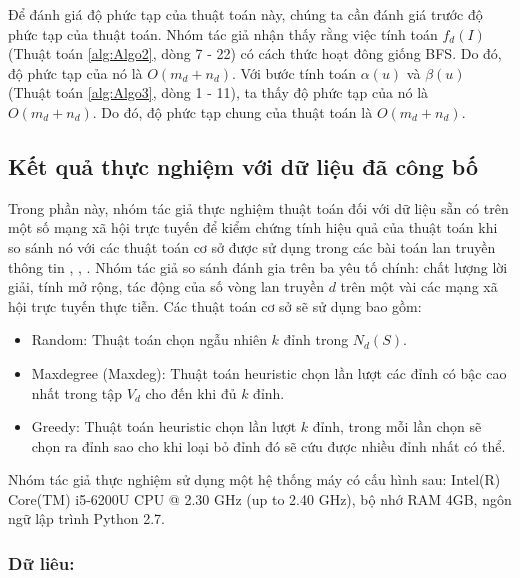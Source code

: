 Để đánh giá độ phức tạp của thuật toán này, chúng ta cần đánh giá trước độ phức tạp của thuật toán. Nhóm tác giả nhận thấy rằng việc tính  toán $f_{d}(I)$ (Thuật toán \ref{alg:Algo2}, dòng 7 - 22) có cách thức hoạt đông giống BFS. Do đó, độ phức tạp của nó là $O(m_{d} + n_{d})$. Với bước tính toán $\alpha(u)$ và $\beta(u)$ (Thuật toán \ref{alg:Algo3}, dòng 1 - 11), ta thấy độ phức tạp của nó là $O(m_{d} + n_{d})$. Do đó, độ phức tạp chung của thuật toán là $O(m_{d} + n_{d})$. 

\subsection{Kết quả thực nghiệm với dữ liệu đã công bố}

Trong phần này, nhóm tác giả thực nghiệm thuật toán đối với dữ liệu sẵn có trên một số mạng xã hội trực tuyến để kiểm chứng tính hiệu quả của thuật toán khi so sánh nó với các thuật toán cơ sở được sử dụng trong các bài toán lan truyền thông tin \cite{nguyen30}, \cite{kemple1}, \cite{zhang32}. Nhóm tác giả so sánh đánh gia trên ba yêu tố chính: chất lượng lời giải, tính mở rộng, tác động của số vòng lan truyền $d$ trên một vài các mạng xã hội trực tuyến thực tiễn. Các thuật toán cơ sở sẽ sử dụng bao gồm:
\begin{itemize}
	\item Random: Thuật toán chọn ngẫu nhiên $k$ đỉnh trong $N_{d}(S)$.
	
	\item Maxdegree (Maxdeg): Thuật toán heuristic chọn lần lượt các đỉnh có bậc cao nhất trong tập $V_{d}$ cho đến khi đủ $k$ đỉnh.
	
	\item Greedy: Thuật toán heuristic chọn lần lượt $k$ đỉnh, trong mỗi lần chọn sẽ chọn ra đỉnh sao cho khi loại bỏ đỉnh đó sẽ cứu được nhiều đỉnh nhất có thể.
\end{itemize}

Nhóm tác giả thực nghiệm sử dụng một hệ thống máy có cấu hình sau: Intel(R) Core(TM) i5-6200U CPU @ 2.30 GHz (up to 2.40 GHz), bộ nhớ RAM 4GB, ngôn ngữ lập trình Python 2.7.

\subsubsection{Dữ liêu:}

